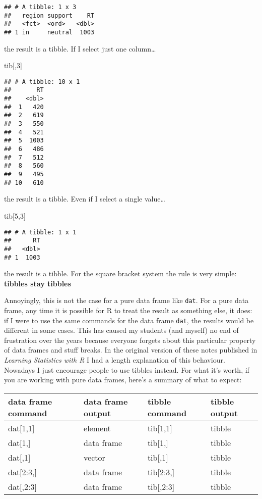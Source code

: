 \documentclass[]{book}
\newenvironment{Shaded}{\begin{snugshade}}{\end{snugshade}}
\newcommand{\DecValTok}[1]{\textcolor[rgb]{0.00,0.00,0.81}{#1}}
\newcommand{\NormalTok}[1]{#1}
\begin{document}
\begin{verbatim}
## # A tibble: 1 x 3
##   region support    RT
##   <fct>  <ord>   <dbl>
## 1 in     neutral  1003
\end{verbatim}

the result is a tibble. If I select just one column\ldots{}

\begin{Shaded}
\begin{Highlighting}[]
\NormalTok{tib[,}\DecValTok{3}\NormalTok{]}
\end{Highlighting}
\end{Shaded}

\begin{verbatim}
## # A tibble: 10 x 1
##       RT
##    <dbl>
##  1   420
##  2   619
##  3   550
##  4   521
##  5  1003
##  6   486
##  7   512
##  8   560
##  9   495
## 10   610
\end{verbatim}

the result is a tibble. Even if I select a single value\ldots{}

\begin{Shaded}
\begin{Highlighting}[]
\NormalTok{tib[}\DecValTok{5}\NormalTok{,}\DecValTok{3}\NormalTok{]}
\end{Highlighting}
\end{Shaded}

\begin{verbatim}
## # A tibble: 1 x 1
##      RT
##   <dbl>
## 1  1003
\end{verbatim}

the result is a tibble. For the square bracket system the rule is very simple: \textbf{tibbles stay tibbles}

Annoyingly, this is not the case for a pure data frame like \texttt{dat}. For a pure data frame, any time it is possible for R to treat the result as something else, it does: if I were to use the same commands for the data frame \texttt{dat}, the results would be different in some cases. This has caused my students (and myself) no end of frustration over the years because everyone forgets about this particular property of data frames and stuff breaks. In the original version of these notes published in \emph{Learning Statistics with R} I had a length explanation of this behaviour. Nowadays I just encourage people to use tibbles instead. For what it's worth, if you are working with pure data frames, here's a summary of what to expect:

\begin{tabular}{l|l|l|l}
\hline
data frame command & data frame output & tibble command & tibble output\\
\hline
dat[1,1] & element & tib[1,1] & tibble\\
\hline
dat[1,] & data frame & tib[1,] & tibble\\
\hline
dat[,1] & vector & tib[,1] & tibble\\
\hline
dat[2:3,] & data frame & tib[2:3,] & tibble\\
\hline
dat[,2:3] & data frame & tib[,2:3] & tibble\\
\hline
\end{tabular}
\end{document}
